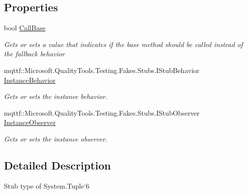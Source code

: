 \subsection*{Properties}
\begin{DoxyCompactItemize}
\item 
bool \hyperlink{class_system_1_1_fakes_1_1_stub_tuple_3_01_t1_00_01_t2_00_01_t3_00_01_t4_00_01_t5_00_01_t6_01_4_a109c8903d5fa55a85e466b14e2664bd6}{Call\-Base}
\begin{DoxyCompactList}\small\item\em Gets or sets a value that indicates if the base method should be called instead of the fallback behavior\end{DoxyCompactList}\item 
mqttf\-::\-Microsoft.\-Quality\-Tools.\-Testing.\-Fakes.\-Stubs.\-I\-Stub\-Behavior \hyperlink{class_system_1_1_fakes_1_1_stub_tuple_3_01_t1_00_01_t2_00_01_t3_00_01_t4_00_01_t5_00_01_t6_01_4_a82afcfa312cbc7ebeda81bba8985371a}{Instance\-Behavior}
\begin{DoxyCompactList}\small\item\em Gets or sets the instance behavior.\end{DoxyCompactList}\item 
mqttf\-::\-Microsoft.\-Quality\-Tools.\-Testing.\-Fakes.\-Stubs.\-I\-Stub\-Observer \hyperlink{class_system_1_1_fakes_1_1_stub_tuple_3_01_t1_00_01_t2_00_01_t3_00_01_t4_00_01_t5_00_01_t6_01_4_ad3e3a656b287cfb4877723c5065157c0}{Instance\-Observer}
\begin{DoxyCompactList}\small\item\em Gets or sets the instance observer.\end{DoxyCompactList}\end{DoxyCompactItemize}


\subsection{Detailed Description}
Stub type of System.\-Tuple`6



